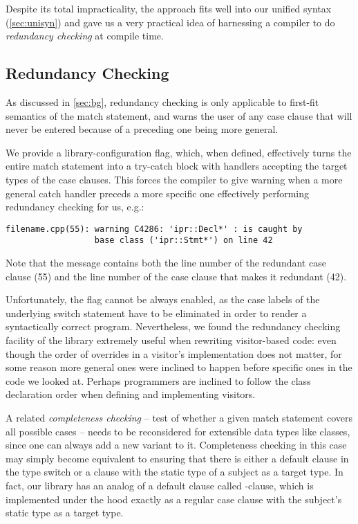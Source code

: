 Despite its total impracticality, the approach fits well into our unified syntax 
(\textsection\ref{sec:unisyn}) and gave us a very practical idea of 
harnessing a \Cpp{} compiler to do \emph{redundancy checking} at compile time.

\subsection{Redundancy Checking}
\label{sec:redun}

As discussed in \textsection\ref{sec:bg}, redundancy checking is only applicable 
to first-fit semantics of the match statement, and warns the user of any 
case clause that will never be entered because of a preceding one being more 
general.

We provide a library-configuration flag, which, when defined, effectively turns 
the entire match statement into a try-catch block with handlers accepting the 
target types of the case clauses. This forces the compiler to give warning when 
a more general catch handler preceds a more specific one effectively performing 
redundancy checking for us, e.g.:

\begin{lstlisting}
filename.cpp(55): warning C4286: 'ipr::Decl*' : is caught by 
                  base class ('ipr::Stmt*') on line 42
\end{lstlisting}

\noindent
Note that the message contains both the line number of the redundant case clause (55) 
and the line number of the case clause that makes it redundant (42).

Unfortunately, the flag cannot be always enabled, as the case labels of the underlying 
switch statement have to be eliminated in order to render a syntactically 
correct program. Nevertheless, we found the redundancy checking facility of the 
library extremely useful when rewriting visitor-based code: even though the 
order of overrides in a visitor's implementation does not matter, for some reason 
more general ones were inclined to happen before specific ones in the code we 
looked at. Perhaps programmers are inclined to follow the class declaration order when 
defining and implementing visitors.

A related \emph{completeness checking} -- test of whether a given match 
statement covers all possible cases -- needs to be reconsidered for extensible 
data types like classes, since one can always add a new variant to it. 
Completeness checking in this case may simply become equivalent to ensuring that 
there is either a default clause in the type switch or a clause with the static type 
of a subject as a target type. In fact, our library has an analog of a default 
clause called -clause, which is implemented under the hood 
exactly as a regular case clause with the subject's static type as a target type.

